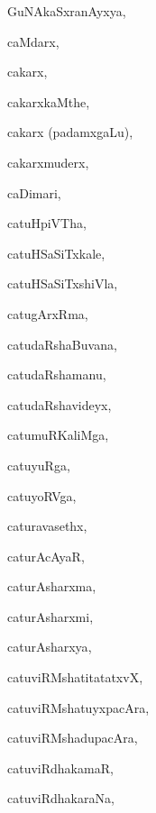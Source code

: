 \begin{multicols}{3}
{\noindent
{GuNAkaSxranAyxya}, \pageref{GuNAkaSxranAyxya}

\bigskip
\noindent
{}
\smallskip

\noindent
{caMdarx}, \pageref{caMdarx}

\noindent
{cakarx}, \pageref{cakarx}

\noindent
{cakarxkaMthe}, \pageref{cakarxkaMthe}

\noindent
{cakarx (padamxgaLu)}, \pageref{cakarx (padamxgaLu)}

\noindent
{cakarxmuderx}, \pageref{cakarxmuderx}

\noindent
{caDimari}, \pageref{caDimari}

\noindent
{catuHpiVTha}, \pageref{catuHpiVTha}

\noindent
{catuHSaSiTxkale}, \pageref{catuHSaSiTxkale}

\noindent
{catuHSaSiTxshiVla}, \pageref{catuHSaSiTxshiVla}

\noindent
{catugArxRma}, \pageref{catugArxRma}

\noindent
{catudaRshaBuvana}, \pageref{catudaRshaBuvana}

\noindent
{catudaRshamanu}, \pageref{catudaRshamanu}

\noindent
{catudaRshavideyx}, \pageref{catudaRshavideyx}

\noindent
{catumuRKaliMga}, \pageref{catumuRKaliMga}

\noindent
{catuyuRga}, \pageref{catuyuRga}

\noindent
{catuyoRVga}, \pageref{catuyoRVga}

\noindent
{caturavasethx}, \pageref{caturavasethx}

\noindent
{caturAcAyaR}, \pageref{caturAcAyaR}

\noindent
{caturAsharxma}, \pageref{caturAsharxma}

\noindent
{caturAsharxmi}, \pageref{caturAsharxmi}

\noindent
{caturAsharxya}, \pageref{caturAsharxya}

\noindent
{catuviRMshatitatatxvX}, \pageref{catuviRMshatitatatxvX}

\noindent
{catuviRMshatuyxpacAra}, \pageref{catuviRMshatuyxpacAra}

\noindent
{catuviRMshadupacAra}, \pageref{catuviRMshadupacAra}

\noindent
{catuviRdhakamaR}, \pageref{catuviRdhakamaR}

\noindent
{catuviRdhakaraNa}, \pageref{catuviRdhakaraNa}

}
\end{multicols}
